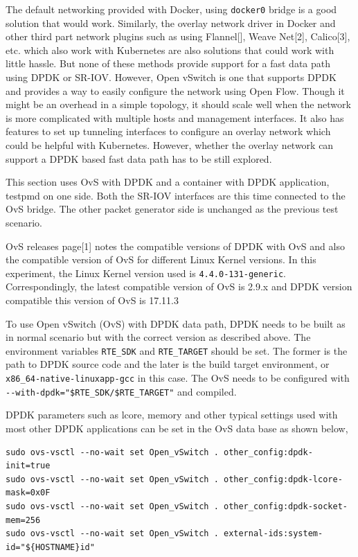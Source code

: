 \documentclass[english, 12pt, a4paper, elec, utf8, a-1b, online]{aaltothesis}
\begin{document}
The default networking provided with Docker, using \lstinline{docker0} bridge is a good solution that would work. Similarly, the overlay network driver in Docker and other third part network plugins such as using Flannel[], Weave Net[2], Calico[3], etc. which also work with Kubernetes are also solutions that could work with little hassle. But none of these methods provide support for a fast data path using DPDK or SR-IOV. However, Open vSwitch is one that supports DPDK and provides a way to easily configure the network using Open Flow. Though it might be an overhead in a simple topology, it should scale well when the network is more complicated with multiple hosts and management interfaces. It also has features to set up tunneling interfaces to configure an overlay network which could be helpful with Kubernetes. However, whether the overlay network can support a DPDK based fast data path has to be still explored.

This section uses OvS with DPDK and a container with DPDK application, testpmd on one side. Both the SR-IOV interfaces are this time connected to the OvS bridge. The other packet generator side is unchanged as the previous test scenario.

OvS releases page[1] notes the compatible versions of DPDK with OvS and also the compatible version of OvS for different Linux Kernel versions. In this experiment, the Linux Kernel version used is \lstinline{4.4.0-131-generic}. Correspondingly, the latest compatible version of OvS is 2.9.x and DPDK version compatible this version of OvS is 17.11.3

To use Open vSwitch (OvS) with DPDK data path, DPDK needs to be built as in normal scenario but with the correct version as described above. The environment variables \lstinline{RTE_SDK} and \lstinline{RTE_TARGET} should be set. The former is the path to DPDK source code and the later is the build target environment, or \lstinline{x86_64-native-linuxapp-gcc} in this case. The OvS needs to be configured with \lstinline{--with-dpdk="$RTE_SDK/$RTE_TARGET"} and compiled.

DPDK parameters such as lcore, memory and other typical settings used with most other DPDK applications can be set in the OvS data base as shown below,

\begin{lstlisting}[basicstyle={\small\ttfamily}]
sudo ovs-vsctl --no-wait set Open_vSwitch . other_config:dpdk-init=true
sudo ovs-vsctl --no-wait set Open_vSwitch . other_config:dpdk-lcore-mask=0x0F
sudo ovs-vsctl --no-wait set Open_vSwitch . other_config:dpdk-socket-mem=256
sudo ovs-vsctl --no-wait set Open_vSwitch . external-ids:system-id="${HOSTNAME}id"
\end{lstlisting}
\end{document}
